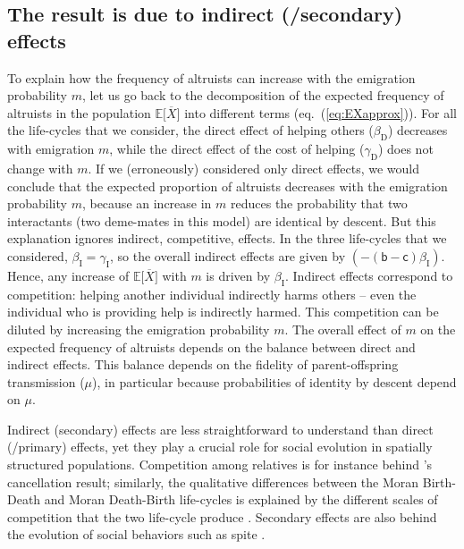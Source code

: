 \documentclass[11pt, letterpaper]{article}
\renewcommand{\eqref}[1]{\textup{{\normalfont eq.~(\ref{#1}}\normalfont)}}
\newcommand{\Esp}[1]{\mathbb{E}\big[ #1\big]}%
\newcommand{\bb}{\mathsf{b}}
\newcommand{\cc}{\mathsf{c}}
\newcommand{\direct}{\mathrm{D}}
\newcommand{\indirect}{\mathrm{I}}
\newcommand{\out}{\textrm{out}}
\newcommand{\Qout}{Q_{\out}}
\begin{document}
\subsection*{The result is due to indirect (/secondary) effects}
To explain how the frequency of altruists can increase with the emigration probability $m$, let us go back to the decomposition of the expected frequency of altruists in the population $\Esp{\overline{X}}$ into different terms (\eqref{eq:EXapprox}). 
For all the life-cycles that we consider, the direct effect of helping others ($\beta_{\direct}$) decreases with emigration $m$, while the direct effect of the cost of helping ($\gamma_{\direct}$) does not change with $m$. 
If we (erroneously) considered only direct effects, we would conclude that the expected proportion of altruists decreases with the emigration probability $m$, because an increase in $m$ reduces the probability that two interactants (two deme-mates in this model) are identical by descent. 
But this explanation ignores indirect, competitive, effects. In the three life-cycles that we considered, $\beta_{\indirect} = \gamma_{\indirect}$, so the overall indirect effects are given by $(-(\bb-\cc) \beta_{\indirect})$. Hence, any increase of $\Esp{\overline{X}}$ with $m$ is driven by $\beta_{\indirect}$. Indirect effects correspond to competition: helping another individual indirectly harms others -- even the individual who is providing help is indirectly harmed. This competition can be diluted by increasing the emigration probability $m$. 
The overall effect of $m$ on the expected frequency of altruists depends on the balance between direct and indirect effects. This balance depends on the fidelity of parent-offspring transmission ($\mu$), in particular because probabilities of identity by descent depend on $\mu$. 

Indirect (secondary) effects are less straightforward to understand than direct (/primary) effects, yet they play a crucial role for social evolution in spatially structured populations. Competition among relatives is for instance behind \citet{Taylor1992}'s cancellation result; similarly, the qualitative differences between the Moran Birth-Death and Moran Death-Birth life-cycles is explained by the different scales of competition that the two life-cycle produce \citep{GrafenArchetti2008, DebarreHD2014}. Secondary effects are also behind the evolution of social behaviors such as spite \citep{WestGardner2010}. 

\end{document}
